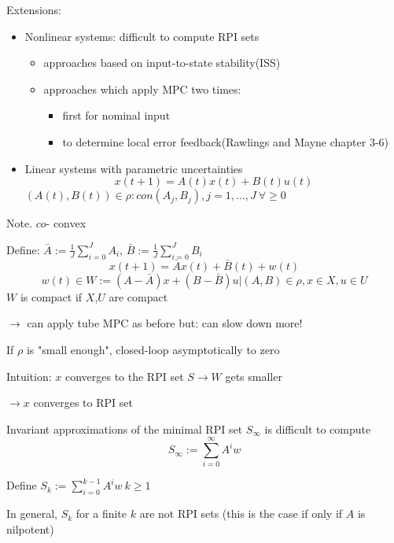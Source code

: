 Extensions:
\begin{itemize}
\item Nonlinear systems: difficult to compute RPI sets
\begin{itemize}
\item approaches based on input-to-state stability(ISS)
\item approaches which apply MPC two times:
\begin{itemize}
\item first for nominal input
\item to determine local error feedback(Rawlings and Mayne chapter 3-6)
\end{itemize}
\end{itemize}
\item Linear systems with parametric uncertainties
\begin{equation*}
x(t+1) = A(t)x(t) + B(t)u(t)
\end{equation*}
$(A(t),B(t)) \in \rho : con{(A_j,B_j), j = 1,...,J} \ \forall \geq 0$ 
\end{itemize}
Note. $co$- convex

Define: $\bar{A} := \frac{1}{J}\sum_{i=0}^{J}A_i$, $\bar{B} := \frac{1}{J}\sum_{i=0}^{J}B_i$
\begin{equation*}
x(t+1) = \bar{A}x(t) + \bar{B}(t) + w(t)
\end{equation*}
\begin{equation*}
w(t) \in W := {(A-\bar{A})x + (B-\bar{B})u | (A,B) \in \rho, x \in X, u \in U}
\end{equation*}
$W$ is compact if $X$,$U$ are compact

$\rightarrow$ can apply tube MPC as before
but: can slow down more!

If $\rho$ is "small enough", closed-loop asymptotically to zero

Intuition: $x$ converges to the RPI set $S \rightarrow W$ gets smaller 

$\rightarrow x$ converges to RPI set

Invariant approximations of the minimal RPI set $S_{\infty}$ is difficult to compute
\begin{equation*}
S_{\infty} := \sum_{i=0}^{\infty}A^iw
\end{equation*}

Define $S_k := \sum_{i=0}^{k-1}A^iw \ k \geq 1$

In general, $S_k$ for a finite $k$ are not RPI sets (this is the case if only if $A$ is nilpotent)

